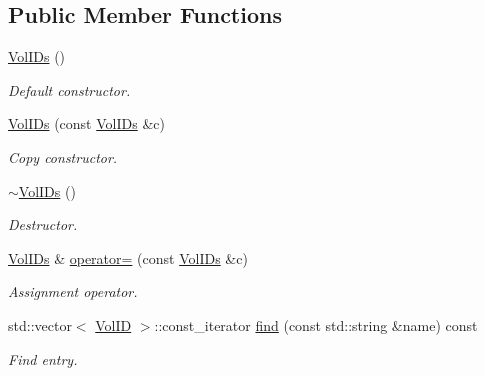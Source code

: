 \subsection*{Public Member Functions}
\begin{DoxyCompactItemize}
\item 
\hyperlink{class_d_d4hep_1_1_geometry_1_1_placed_volume_extension_1_1_vol_i_ds_a83ca12f7cd6c231504251ce741295f64}{VolIDs} ()
\begin{DoxyCompactList}\small\item\em Default constructor. \item\end{DoxyCompactList}\item 
\hyperlink{class_d_d4hep_1_1_geometry_1_1_placed_volume_extension_1_1_vol_i_ds_af8871280ae9f0c0381490086de225316}{VolIDs} (const \hyperlink{class_d_d4hep_1_1_geometry_1_1_placed_volume_extension_1_1_vol_i_ds}{VolIDs} \&c)
\begin{DoxyCompactList}\small\item\em Copy constructor. \item\end{DoxyCompactList}\item 
\hyperlink{class_d_d4hep_1_1_geometry_1_1_placed_volume_extension_1_1_vol_i_ds_ab42d6bd0b015ff8dec78a37c29b0a994}{$\sim$VolIDs} ()
\begin{DoxyCompactList}\small\item\em Destructor. \item\end{DoxyCompactList}\item 
\hyperlink{class_d_d4hep_1_1_geometry_1_1_placed_volume_extension_1_1_vol_i_ds}{VolIDs} \& \hyperlink{class_d_d4hep_1_1_geometry_1_1_placed_volume_extension_1_1_vol_i_ds_a92f2c199ac269cbe4654be12f268bb3d}{operator=} (const \hyperlink{class_d_d4hep_1_1_geometry_1_1_placed_volume_extension_1_1_vol_i_ds}{VolIDs} \&c)
\begin{DoxyCompactList}\small\item\em Assignment operator. \item\end{DoxyCompactList}\item 
std::vector$<$ \hyperlink{class_d_d4hep_1_1_geometry_1_1_placed_volume_extension_a9f0e95dedfbda206b118af985b2ed473}{VolID} $>$::const\_\-iterator \hyperlink{class_d_d4hep_1_1_geometry_1_1_placed_volume_extension_1_1_vol_i_ds_ab81a867b54e328f612c96d4b92edeb50}{find} (const std::string \&name) const 
\begin{DoxyCompactList}\small\item\em Find entry. \item\end{DoxyCompactList}\item 

\end{DoxyCompactItemize}
